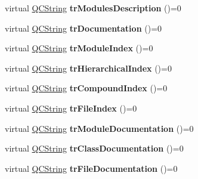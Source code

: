 \begin{DoxyCompactItemize}
\item 
\hypertarget{class_translator_aed88935b8f50cf1e52f7df36799adc9e}{virtual \hyperlink{class_q_c_string}{Q\-C\-String} {\bfseries tr\-Modules\-Description} ()=0}\label{class_translator_aed88935b8f50cf1e52f7df36799adc9e}

\item 
\hypertarget{class_translator_aafb930a40c231e9aae593d86b3ba99c3}{virtual \hyperlink{class_q_c_string}{Q\-C\-String} {\bfseries tr\-Documentation} ()=0}\label{class_translator_aafb930a40c231e9aae593d86b3ba99c3}

\item 
\hypertarget{class_translator_adf23a881bc88dc11ae61c7611304ca0c}{virtual \hyperlink{class_q_c_string}{Q\-C\-String} {\bfseries tr\-Module\-Index} ()=0}\label{class_translator_adf23a881bc88dc11ae61c7611304ca0c}

\item 
\hypertarget{class_translator_a748ffd77e9f471adb2db553f3dcfa3b0}{virtual \hyperlink{class_q_c_string}{Q\-C\-String} {\bfseries tr\-Hierarchical\-Index} ()=0}\label{class_translator_a748ffd77e9f471adb2db553f3dcfa3b0}

\item 
\hypertarget{class_translator_a5646eea8d3c18bfe9fee955cfd217b7c}{virtual \hyperlink{class_q_c_string}{Q\-C\-String} {\bfseries tr\-Compound\-Index} ()=0}\label{class_translator_a5646eea8d3c18bfe9fee955cfd217b7c}

\item 
\hypertarget{class_translator_af562edcc631a704dbe54e491a51ac128}{virtual \hyperlink{class_q_c_string}{Q\-C\-String} {\bfseries tr\-File\-Index} ()=0}\label{class_translator_af562edcc631a704dbe54e491a51ac128}

\item 
\hypertarget{class_translator_a979e6b59cb764b059656a8ae9a8ae611}{virtual \hyperlink{class_q_c_string}{Q\-C\-String} {\bfseries tr\-Module\-Documentation} ()=0}\label{class_translator_a979e6b59cb764b059656a8ae9a8ae611}

\item 
\hypertarget{class_translator_aa6f4c1184b8a438637a483732a446964}{virtual \hyperlink{class_q_c_string}{Q\-C\-String} {\bfseries tr\-Class\-Documentation} ()=0}\label{class_translator_aa6f4c1184b8a438637a483732a446964}

\item 
\hypertarget{class_translator_ad626171232048652bbe622c53e742620}{virtual \hyperlink{class_q_c_string}{Q\-C\-String} {\bfseries tr\-File\-Documentation} ()=0}\label{class_translator_ad626171232048652bbe622c53e742620}


\end{DoxyCompactItemize}
